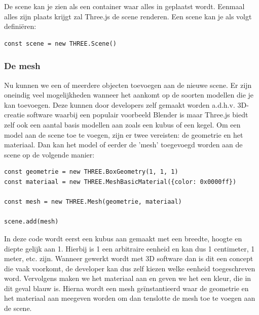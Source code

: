 De scene kan je zien als een container waar alles in geplaatst wordt. Eenmaal alles zijn plaats krijgt zal Three.js de scene renderen. Een scene kan je als volgt definiëren: 

\begin{lstlisting}
const scene = new THREE.Scene()
\end{lstlisting}

\subsubsection{De mesh}

Nu kunnen we een of meerdere objecten toevoegen aan de nieuwe scene. Er zijn oneindig veel mogelijkheden wanneer het aankomt op de soorten modellen die je kan toevoegen. Deze kunnen door developers zelf gemaakt worden a.d.h.v. 3D-creatie software waarbij een populair voorbeeld Blender is maar Three.js biedt zelf ook een aantal basis modellen aan zoals een kubus of een kegel.
Om een model aan de scene toe te voegen, zijn er twee vereisten: de geometrie en het materiaal. Dan kan het model of eerder de 'mesh' toegevoegd worden aan de scene op de volgende manier:

\begin{lstlisting}
const geometrie = new THREE.BoxGeometry(1, 1, 1)
const materiaal = new THREE.MeshBasicMaterial({color: 0x0000ff})

const mesh = new THREE.Mesh(geometrie, materiaal)

scene.add(mesh)
\end{lstlisting}

In deze code wordt eerst een kubus aan gemaakt met een breedte, hoogte en diepte gelijk aan 1. Hierbij is 1 een arbitraire eenheid en kan dus 1 centimeter, 1 meter, etc. zijn. Wanneer gewerkt wordt met 3D software dan is dit een concept die vaak voorkomt, de developer kan dus zelf kiezen welke eenheid toegeschreven word. Vervolgens maken we het materiaal aan en geven we het een kleur, die in dit geval blauw is. Hierna wordt een mesh geïnstantieerd waar de geometrie en het materiaal aan meegeven worden om dan tenslotte de mesh toe te voegen aan de scene.


